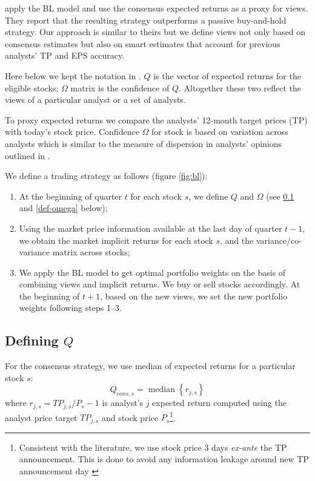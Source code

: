 \documentclass{article}\usepackage[]{graphicx}\usepackage[]{color}
\DeclareMathOperator*{\median}{median}
\begin{document}
\cite{da2011bl} apply the BL model and use the consensus expected returns as a proxy for views. They report that the resulting strategy outperforms a passive buy-and-hold strategy. Our approach is similar to theirs but we define views not only based on consensus estimates but also on smart estimates that account for previous analysts' TP and EPS accuracy.

Here below we kept the notation in \cite{black1992}.  $Q$ is the vector of  expected returns for the eligible stocks; $\Omega$ matrix is the confidence of $Q$. Altogether these two reflect the views of a particular analyst or a set of analysts.

To proxy expected returns we compare the analysts' 12-month target prices (TP) with today's stock price. Confidence $\Omega$ for stock is based on variation  across analysts which is similar to the measure of dispersion in analysts' opinions outlined in \cite{diether2002}.


We define a trading strategy as follows (figure \ref{fig:bl}):
\begin{enumerate}
\item  At the beginning of quarter $t$ for each stock $s$,   we define $Q$ and $\Omega$ (see \ref{def-q} and \ref{def-omega} below);

\item Using the market price information available at the last day of quarter $t-1$, we obtain the market implicit returns for each stock $s$,  and the variance/co-variance matrix across stocks;

\item We apply the BL model to get  optimal portfolio weights on the basis of combining views and implicit returns. We  buy or sell stocks accordingly. At the beginning of $t+1$, based on the new views, we set the new portfolio weights following  steps 1--3.
\end{enumerate}

\subsection{Defining $Q$}
\label{def-q}

For the consensus strategy, we use median of expected returns for a particular stock $s$:
\begin{equation}
\label{consq}
Q_{cons,s}= \median \left\{r_{j,s}\right\}
\end{equation}
where $r_{j,s}=TP_{j,s}/P_{s}-1$  is analyst's $j$ expected return computed using the analyst price target $TP_{j,s}$ and stock price $P_{s}$\footnote{Consistent with the literature, we use stock price 3 days \emph{ex-ante} the TP announcement. This is done to avoid any information leakage around new TP announcement day \citep{bonini2010}}. 
\end{document}

